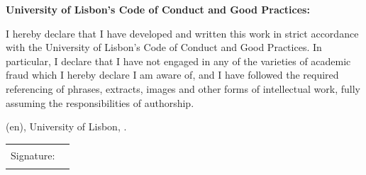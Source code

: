 
%

\thispagestyle{empty}

\begin{center}
  \textbf{University of Lisbon's Code of Conduct and Good Practices:}
\end{center}

\bigskip

\noindent
I hereby declare that I have developed and written this work in strict
accordance with the University of Lisbon's Code of Conduct and Good
Practices. In particular, I declare that I have not engaged in any of the
varieties of academic fraud which I hereby declare I am aware of, and I
have followed the required referencing of phrases, extracts, images and
other forms of intellectual work, fully assuming the responsibilities of
authorship.

\vfill

\noindent
\GetSchool(en), University of Lisbon,
.\par
\bigskip
\begin{tabularx}{\linewidth}{@{}lX@{}}
Signature: & \rule{\linewidth}{0.75pt}
\end{tabularx}
